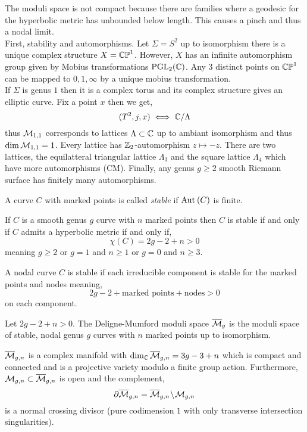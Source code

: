 \documentclass[12pt]{article}
\begin{document}
The moduli space is not compact because there are families where a geodesic for the hyperbolic metric has unbounded below length. This causes a pinch and thus a nodal limit. 
\bigskip\\
First, stability and automorphisms. Let $\Sigma = S^2$ up to isomorphism there is a unique complex structure $X = \mathbb{CP}^1$. However, $X$ has an infinite automorphism group given by Mobius transformations $\mathrm{PGL}_2(\mathbb{C})$. 
Any $3$ distinct points on $\mathbb{CP}^1$ can be mapped to $0,1,\infty$ by a unique mobius transformation. 
\bigskip\\
If $\Sigma$ is genus $1$ then it is a complex torus and its complex structure gives an elliptic curve. Fix a point $x$ then we get,
\[ (T^2, j, x) \iff \mathbb{C} / \Lambda \]
thus $\mathcal{M}_{1,1}$ corresponds to lattices $\Lambda \subset \mathbb{C}$ up to ambiant isomorphism and thus $\dim{\mathcal{M}_{1,1}} = 1$. Every lattice has $\mathbb{Z}_2$-automorphism $z \mapsto -z$. There are two lattices, the equilatteral triangular lattice $\Lambda_3$ and the square lattice $\Lambda_4$ which have more automorphisms (CM). Finally, any genus $g \ge 2$ smooth Riemann surface has finitely many automorphisms.

\begin{defn}
A curve $C$ with marked points is called \textit{stable} if $\mathrm{Aut}_{} \left( C \right)$ is finite.
\end{defn}

\begin{prop}
If $C$ is a smooth genus $g$ curve with $n$ marked points then $C$ is stable if and only if $C$ admits a hyperbolic metric if and only if,
\[ \chi(C) = 2g - 2 + n > 0 \]
meaning $g \ge 2$ or $g = 1$ and $n \ge 1$ or $g = 0$ and $n \ge 3$. 
\end{prop}

\begin{defn}
A nodal curve $C$ is stable if each irreducible component is stable for the marked points and nodes meaning,
\[ 2g - 2 + \text{marked points} + \text{nodes} > 0 \]
on each component. 
\end{defn}

\begin{defn}
Let $2g - 2 + n > 0$. The Deligne-Mumford moduli space $\overline{\mathcal{M}}_g$ is the moduli space of stable, nodal genus $g$ curves with $n$ marked points up to isomorphism. 
\end{defn}

\begin{thm}
$\overline{\mathcal{M}}_{g,n}$ is a complex manifold with $\dim_{\mathbb{C}} \overline{\mathcal{M}}_{g,n} = 3 g - 3 + n$ which is compact and connected and is a projective variety modulo a finite group action. Furthermore, $\mathcal{M}_{g,n} \subset \overline{\mathcal{M}}_{g,n}$ is open and the complement,
\[ \partial \overline{\mathcal{M}}_{g,n} = \overline{\mathcal{M}}_{g,n} \! \setminus \! \mathcal{M}_{g,n} \]
is a normal crossing divisor (pure codimension $1$ with only transverse intersection singularities).  
\end{thm}
\end{document}
